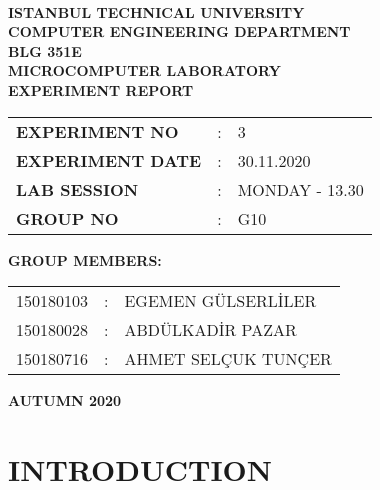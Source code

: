 \documentclass[pdftex,12pt,a4paper]{article}
\begin{document}
\begin{titlepage}
\begin{center}
\textbf{}\\
\textbf{\Large{ISTANBUL TECHNICAL UNIVERSITY}}\\
\vspace{0.5cm}
\textbf{\Large{COMPUTER ENGINEERING DEPARTMENT}}\\
\vspace{2cm}
\textbf{\Large{BLG 351E\\ MICROCOMPUTER LABORATORY\\ EXPERIMENT REPORT}}\\
\vspace{2.8cm}
\begin{table}[ht]
\centering
\Large{
\begin{tabular}{lcl}
\textbf{EXPERIMENT NO}  & : & 3 \\
\textbf{EXPERIMENT DATE}  & : & 30.11.2020 \\
\textbf{LAB SESSION}  & : & MONDAY - 13.30 \\
\textbf{GROUP NO}  & : & G10 \\
\end{tabular}}
\end{table}
\vspace{1cm}
\textbf{\Large{GROUP MEMBERS:}}\\
\begin{table}[ht]
\centering
\Large{
\begin{tabular}{rcl}
150180103  & : & EGEMEN GÜLSERLİLER \\
150180028  & : & ABDÜLKADİR PAZAR \\
150180716  & : & AHMET SELÇUK TUNÇER \\
\end{tabular}}
\end{table}
\vspace{2.8cm}
\textbf{\Large{AUTUMN 2020}}

\end{center}

\end{titlepage}

\thispagestyle{empty}
\setcounter{tocdepth}{4}
\tableofcontents
\clearpage

\setcounter{page}{1}

\section{INTRODUCTION}
\end{document}

